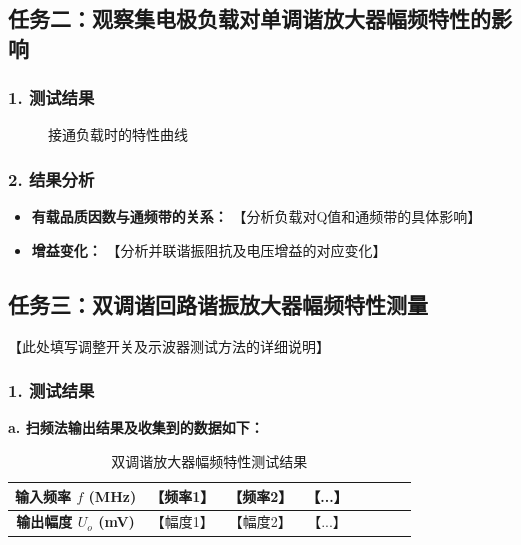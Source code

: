 \documentclass[12pt]{article}
\begin{document}
\subsection*{任务二：观察集电极负载对单调谐放大器幅频特性的影响}

\subsubsection*{1. 测试结果}

\begin{figure}[H]
    \centering
    \begin{minipage}[b]{0.48\textwidth}
        \centering
        \caption{断开负载时的特性曲线}
    \end{minipage}
    \hfill
    \begin{minipage}[b]{0.48\textwidth}
        \centering
        \caption{接通负载时的特性曲线}
    \end{minipage}
    \vspace{0.5em}
\end{figure}

\subsubsection*{2. 结果分析}
\begin{itemize}
    \item \textbf{有载品质因数与通频带的关系：} 【分析负载对Q值和通频带的具体影响】
    \item \textbf{增益变化：} 【分析并联谐振阻抗及电压增益的对应变化】
\end{itemize}

\subsection*{任务三：双调谐回路谐振放大器幅频特性测量}

【此处填写调整开关及示波器测试方法的详细说明】

\subsubsection*{1. 测试结果}

\textbf{a. 扫频法输出结果及收集到的数据如下：}

\begin{table}[H]
    \centering
    \begin{tabular}{c*{7}{c}}
    \toprule
    输入频率 $f$ (MHz) & 【频率1】 & 【频率2】 & 【...】 \\
    \midrule
    \textbf{输出幅度 $U_{o}$ (mV)} & 【幅度1】 & 【幅度2】 & 【...】 \\
    \bottomrule
    \end{tabular}
    \caption{双调谐放大器幅频特性测试结果}
    \label{tab:double_tuned_results}
\end{table}
\end{document}
